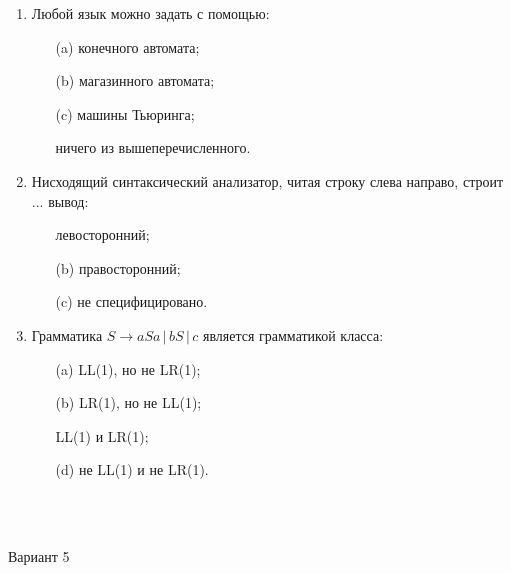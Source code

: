 \documentclass[12pt]{article}
\begin{document}
\begin{enumerate}
    \item Любой язык можно задать с помощью:
    \begin{enumerate}
        \item[(a)] конечного автомата;
        \item[(b)] магазинного автомата;
        \item[(c)] машины Тьюринга;
        \item[\Checkmark] ничего из вышеперечисленного.
    \end{enumerate}
    
    \item Нисходящий синтаксический анализатор, читая строку слева направо, строит ... вывод:
    \begin{enumerate}
        \item[\Checkmark] левосторонний;
        \item[(b)] правосторонний;
        \item[(c)] не специфицировано.
    \end{enumerate}
    
    \item Грамматика $S \rightarrow aSa \, | \, bS \, | \, c$ является грамматикой класса:
    \begin{enumerate}
        \item[(a)] LL(1), но не LR(1);
        \item[(b)] LR(1), но не LL(1);
        \item[\Checkmark] LL(1) и LR(1);
        \item[(d)] не LL(1) и не LR(1).
    \end{enumerate}
\end{enumerate}

~\\~

\medskip
{\Large Вариант 5}
\medskip
\end{document}
